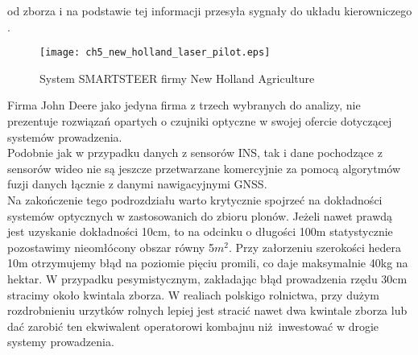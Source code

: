 od zborza i na podstawie tej informacji przesyła sygnały do układu kierowniczego \cite[][strona 18]{NEW_HOLLAND_PLM}.
\begin{figure}[H]
	\centering
	\texttt{[image: ch5\_new\_holland\_laser\_pilot.eps]}
	\caption{System SMARTSTEER firmy New Holland Agriculture}
	\label{fig:new_holland_smartsteer}
\end{figure}
\indent Firma John Deere jako jedyna firma z trzech wybranych do analizy, nie prezentuje rozwiązań opartych o czujniki optyczne w swojej ofercie dotyczącej 
systemów prowadzenia.\\
\indent Podobnie jak w przypadku danych z sensorów INS, tak i dane pochodzące z sensorów wideo nie są jeszcze przetwarzane komercyjnie
za pomocą algorytmów fuzji danych łącznie z danymi nawigacyjnymi GNSS.\\
\indent Na zakończenie tego podrozdziału warto krytycznie spojrzeć na dokładności systemów optycznych w zastosowanich do zbioru plonów.
Jeżeli nawet prawdą jest uzyskanie dokładności 10cm, to na odcinku o długości 100m statystycznie pozostawimy nieomłócony obszar równy 5$m^2$.
Przy załorzeniu szerokości hedera 10m otrzymujemy błąd na poziomie pięciu promili, co daje maksymalnie 40kg na hektar. 
W przypadku pesymistycznym, zakładając błąd prowadzenia rzędu 30cm stracimy około kwintala zborza. 
W realiach polskigo rolnictwa, przy dużym rozdrobnieniu urzytków rolnych lepiej jest stracić nawet dwa kwintale zborza lub 
dać zarobić ten ekwiwalent operatorowi kombajnu niż inwestować w drogie systemy prowadzenia.

